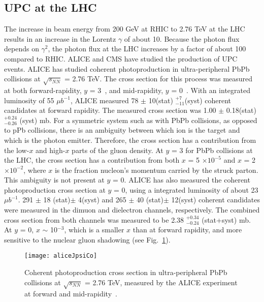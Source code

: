   \subsection{ UPC \JPsi{} at the LHC}
    The increase in beam energy from 200 GeV at RHIC to 2.76 TeV at the LHC 
      results in an increase in the Lorentz $\gamma$ of about 10.
    Because the photon flux depends on $\gamma^{2}$, the photon flux
      at the LHC increases by a factor of about 100 compared to RHIC.
    ALICE and CMS have studied the production of UPC events. 
    ALICE has studied coherent \JPsi{} photoproduction in ultra-peripheral PbPb
      collisions at $\sqrt{s_{NN}}$ = 2.76 TeV. 
   The cross section for this process was measured at both forward-rapidity, 
      $y$ = 3~\cite{Abelev:2012ba}, and mid-rapidity, $y$ = 0~\cite{Abbas:2013oua}.
   With an integrated luminosity of 55 $\mu$$b^{-1}$, ALICE measured 
     78 $\pm$ 10(stat) $^{+7}_{-11}$(syst) coherent \JPsi{} candidates at 
     forward rapidity.
   The measured cross section was 1.00 $\pm$ 0.18(stat) $_{-0.26}^{+0.24}$ 
    (syst) mb.
   For a symmetric system such as with PbPb collisions, as opposed to pPb collisions, 
    there is an ambiguity between which ion is the target and which is the 
    photon emitter. 
  Therefore, the cross section has a contribution from the low-$x$ and high-$x$ 
    parts of the gluon density. 
  At $y$ = 3  for PbPb collisions at the LHC, the cross section has a 
    contribution from both $x$ = 5 $\times 10^{-5}$ and $x$ = 2  $\times 
    10^{-2}$, where $x$ is the fraction nucleon's momentum carried by the 
    struck parton.
  This ambiguity is not present at $y$ = 0.
  ALICE has also measured the coherent \JPsi{} photoproduction cross section 
    at $y$ = 0, using a integrated luminosity of about 23 $\mu$$b^{-1}$.
  291 $\pm$ 18 (stat)$\pm$ 4(syst) and 265 $\pm$ 40 (stat)$\pm$ 12(syst) 
    coherent \JPsi{} candidates were measured in the dimuon and dielectron
    channels, respectively. 
  The combined cross section from both channels was measured to be 
    2.38 $_{-0.24}^{+0.34}$ (stat+syst) mb. 
  At $y$ = 0, $x$ $\sim$ 10$^{-3}$, which is a smaller $x$ than at forward 
    rapidity, and more sensitive to the nuclear gluon shadowing 
    (see Fig.~\ref{fig:aliceMoney}).
    \begin{figure}[!Hhbt]
      \centering
      \texttt{[image: aliceJpsiCo]}
      \caption{Coherent \JPsi{} photoproduction cross section in ultra-peripheral
        PbPb collisions at $\sqrt{s_{NN}}$ = 2.76 TeV, measured by the ALICE 
        experiment at forward and mid-rapidity~\cite{Abelev:2012ba,Abbas:2013oua}.}   
      \label{fig:aliceMoney}
    \end{figure}

